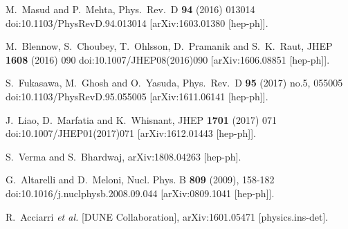 \begin{thebibliography}{00}
  M.~Masud and P.~Mehta,
  Phys.\ Rev.\ D {\bf 94} (2016) 013014
  doi:10.1103/PhysRevD.94.013014
  [arXiv:1603.01380 [hep-ph]].

  M.~Blennow, S.~Choubey, T.~Ohlsson, D.~Pramanik and S.~K.~Raut,
  JHEP {\bf 1608} (2016) 090
  doi:10.1007/JHEP08(2016)090
  [arXiv:1606.08851 [hep-ph]].


  S.~Fukasawa, M.~Ghosh and O.~Yasuda,
  Phys.\ Rev.\ D {\bf 95} (2017) no.5,  055005
  doi:10.1103/PhysRevD.95.055005
  [arXiv:1611.06141 [hep-ph]].
  
  J.~Liao, D.~Marfatia and K.~Whisnant,
  JHEP {\bf 1701} (2017) 071
  doi:10.1007/JHEP01(2017)071
  [arXiv:1612.01443 [hep-ph]].
  
  S.~Verma and S.~Bhardwaj,
  arXiv:1808.04263 [hep-ph].
  
  
G.~Altarelli and D.~Meloni,
Nucl. Phys. B \textbf{809} (2009), 158-182
doi:10.1016/j.nuclphysb.2008.09.044
[arXiv:0809.1041 [hep-ph]].
  

  R.~Acciarri {\it et al.} [DUNE Collaboration],
  arXiv:1601.05471 [physics.ins-det].
  

\end{thebibliography}
